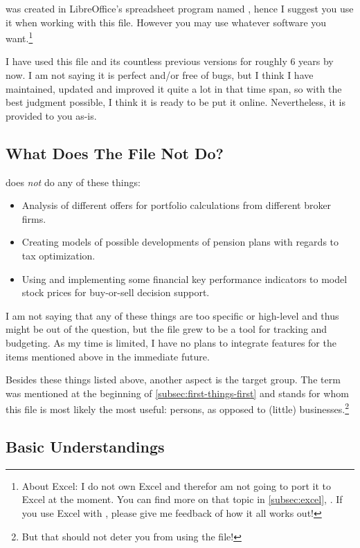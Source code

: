 \tfn was created in LibreOffice's spreadsheet program named , hence I suggest you use it when working with this file.
However you may use whatever software you want.\footnote{About Excel: I do not own Excel and therefor am not going to port it to Excel at the moment.
You can find more on that topic in \autoref{subsec:excel}, .
If you use Excel with \tfn, please give me feedback of how it all works out!}

I have used this file and its countless previous versions for roughly 6 years by now.
I am not saying it is perfect and/or free of bugs, but I think I have maintained, updated and improved it quite a lot in that time span, so with the best judgment possible, I think it is ready to be put it online.
Nevertheless, it is provided to you as-is.

\subsection{What Does The File Not Do?}
\label{subsec:not-included}

\tfn does \emph{not} do any of these things:
\begin{itemize}
	\item Analysis of different offers for portfolio calculations from different broker firms.
	\item Creating models of possible developments of pension plans with regards to tax optimization.
	\item Using and implementing some financial key performance indicators to model stock prices for buy-or-sell decision support.
\end{itemize}
I am not saying that any of these things are too specific or high-level and thus might be out of the question, but the file grew to be a tool for tracking and budgeting.
As my time is limited, I have no plans to integrate features for the items mentioned above in the immediate future.

Besides these things listed above, another aspect is the target group.
The term  was mentioned at the beginning of \autoref{subsec:first-things-first} and stands for whom this file is most likely the most useful: persons, as opposed to (little) businesses.\footnote{But that should not deter you from using the file!}

\subsection{Basic Understandings}
\label{subsec:basic-understandings}

